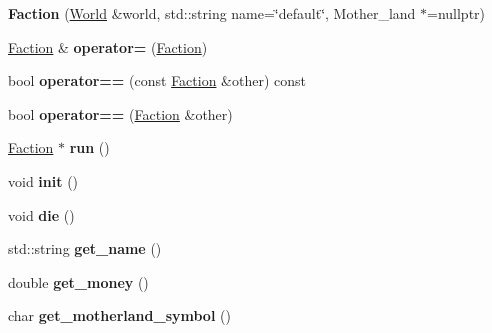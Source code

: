 \begin{DoxyCompactItemize}
\item 
\hypertarget{classFaction_a470f14f0b1d94261d427a4673fe92421}{{\bfseries Faction} (\hyperlink{classWorld}{World} \&world, std\-::string name=\char`\"{}default\char`\"{}, Mother\-\_\-land $\ast$=nullptr)}\label{classFaction_a470f14f0b1d94261d427a4673fe92421}

\item 
\hypertarget{classFaction_add5275f09ab0dd9a43dc7aa6e04e6e8a}{\hyperlink{classFaction}{Faction} \& {\bfseries operator=} (\hyperlink{classFaction}{Faction})}\label{classFaction_add5275f09ab0dd9a43dc7aa6e04e6e8a}

\item 
\hypertarget{classFaction_a92285ba431e78a6fccb7ef1a9283dd65}{bool {\bfseries operator==} (const \hyperlink{classFaction}{Faction} \&other) const }\label{classFaction_a92285ba431e78a6fccb7ef1a9283dd65}

\item 
\hypertarget{classFaction_adce9c9ccf9fe8a20a2680dd918a59a28}{bool {\bfseries operator==} (\hyperlink{classFaction}{Faction} \&other)}\label{classFaction_adce9c9ccf9fe8a20a2680dd918a59a28}

\item 
\hypertarget{classFaction_aa398dcd8f3ca6cf694f69c2de152c538}{\hyperlink{classFaction}{Faction} $\ast$ {\bfseries run} ()}\label{classFaction_aa398dcd8f3ca6cf694f69c2de152c538}

\item 
\hypertarget{classFaction_a4f7c37fe385ee3a41e875aa23b6a8319}{void {\bfseries init} ()}\label{classFaction_a4f7c37fe385ee3a41e875aa23b6a8319}

\item 
\hypertarget{classFaction_a144860993dcfd384b23da00219ed0b88}{void {\bfseries die} ()}\label{classFaction_a144860993dcfd384b23da00219ed0b88}

\item 
\hypertarget{classFaction_ac8ff16ef1f7fa6ba418ae7cf37406170}{std\-::string {\bfseries get\-\_\-name} ()}\label{classFaction_ac8ff16ef1f7fa6ba418ae7cf37406170}

\item 
\hypertarget{classFaction_a0630bba70db7fc1881a5d0a2c7cac1c6}{double {\bfseries get\-\_\-money} ()}\label{classFaction_a0630bba70db7fc1881a5d0a2c7cac1c6}

\item 
\hypertarget{classFaction_ad533ba9bbe8db562be988889553daf14}{char {\bfseries get\-\_\-motherland\-\_\-symbol} ()}\label{classFaction_ad533ba9bbe8db562be988889553daf14}


\end{DoxyCompactItemize}
